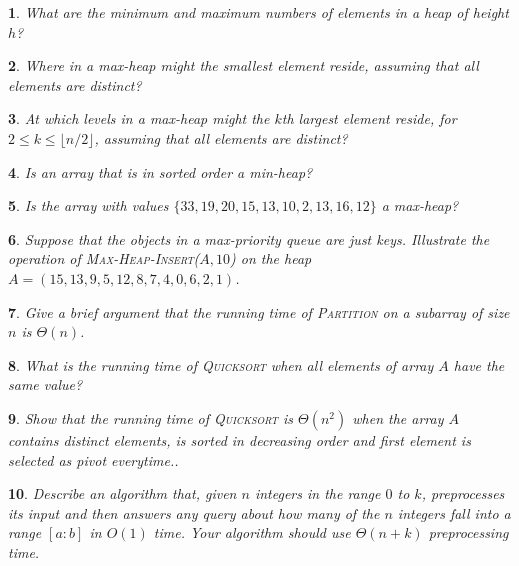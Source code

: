 \documentclass[%
addpoints]{exam}
\theoremstyle{problem}
\newtheorem{p}{}
\begin{document}
\begin{p}
What are the minimum and maximum numbers of elements in a heap of height \( h \)?
\hfill\end{p}

\begin{p}
Where in a max-heap might the smallest element reside, assuming that all elements are distinct?
\hfill\end{p}

\begin{p} 
At which levels in a max-heap might the \( k \)th largest element reside, for \( 2 \leq k \leq \lfloor n/2 \rfloor \), assuming that all elements are distinct?  
\hfill  
\end{p}

\begin{p} 
Is an array that is in sorted order a min-heap?  
\hfill  
\end{p}

\begin{p} 
Is the array with values \( \{33, 19, 20, 15, 13, 10, 2, 13, 16, 12\} \) a max-heap?  
\hfill  
\end{p}

\begin{p} 
Suppose that the objects in a max-priority queue are just keys. Illustrate the operation of \textsc{Max-Heap-Insert}(\( A, 10 \)) on the heap \( A = (15, 13, 9, 5, 12, 8, 7, 4, 0, 6, 2, 1) \).  
\hfill  
\end{p}

\begin{p} 
Give a brief argument that the running time of \textsc{Partition} on a subarray of size \( n \) is \( \Theta(n) \).  
\hfill  
\end{p}

\begin{p} 
What is the running time of \textsc{Quicksort} when all elements of array \( A \) have the same value?  
\hfill  
\end{p}

\begin{p} 
Show that the running time of \textsc{Quicksort} is \( \Theta(n^2) \) when the array \( A \) contains distinct elements, is sorted in decreasing order and first element is selected as pivot everytime..  
\hfill  
\end{p}

\begin{p} 
Describe an algorithm that, given \( n \) integers in the range \( 0 \) to \( k \), preprocesses its input and then answers any query about how many of the \( n \) integers fall into a range \([a:b]\) in \( O(1) \) time. Your algorithm should use \( \Theta(n + k) \) preprocessing time.  
\hfill  
\end{p}
\end{document}
